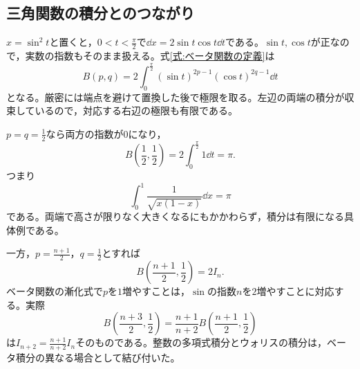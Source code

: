 \subsection{三角関数の積分とのつながり}

$x=\sin^2t$と置くと，$0<t<\frac{\pi}{2}$で$\dd x=2\sin t\cos t\dd t$である。$\sin t,\cos t$が正なので，実数の指数もそのまま扱える。式\eqref{式:ベータ関数の定義}は
\begin{equation}\label{式:ベータ三角表示}
 B(p,q)=2\int_0^{\frac{\pi}{2}}
 (\sin t)^{2p-1}(\cos t)^{2q-1}\dd t
\end{equation}
となる。厳密には端点を避けて置換した後で極限を取る。左辺の両端の積分が収束しているので，対応する右辺の極限も有限である。

$p=q=\frac12$なら両方の指数が$0$になり，
\[
 B\left(\frac12,\frac12\right)
 =2\int_0^{\frac{\pi}{2}}1\dd t=\pi.
\]
つまり
\[
 \int_0^1\frac1{\sqrt{x(1-x)}}\dd x=\pi
\]
である。両端で高さが限りなく大きくなるにもかかわらず，積分は有限になる具体例である。

一方，$p=\frac{n+1}{2}$，$q=\frac12$とすれば
\[
 B\left(\frac{n+1}{2},\frac12\right)=2I_n.
\]
ベータ関数の漸化式で$p$を$1$増やすことは，$\sin$の指数$n$を$2$増やすことに対応する。実際
\[
 B\left(\frac{n+3}{2},\frac12\right)
 =\frac{n+1}{n+2}
  B\left(\frac{n+1}{2},\frac12\right)
\]
は$I_{n+2}=\frac{n+1}{n+2}I_n$そのものである。整数の多項式積分とウォリスの積分は，ベータ積分の異なる場合として結び付いた。

